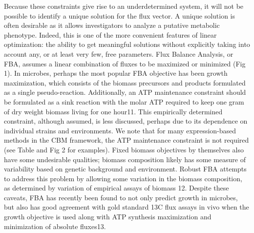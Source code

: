 \documentclass[phd,tocprelim]{cornell}
\theoremstyle{break}
\theoremstyle{empty}
\begin{document}
Because these constraints give rise to an underdetermined system, it
will not be possible to identify a unique solution for the flux
vector. A unique solution is often desirable as it allows
investigators to analyze a putative metabolic phenotype. Indeed, this
is one of the more convenient features of linear optimization: the
ability to get meaningful solutions without explicitly taking into
account any, or at least very few, free parameters.  Flux Balance
Analysis, or FBA, assumes a linear combination of fluxes to be
maximized or minimized (Fig 1). In microbes, perhaps the most popular
FBA objective has been growth maximization, which consists of the
biomass precursors and products formulated as a single
pseudo-reaction. Additionally, an ATP maintenance constraint should be
formulated as a sink reaction with the molar ATP required to keep one
gram of dry weight biomass living for one hour11. This empirically
determined constraint, although assumed, is less discussed, perhaps
due to its dependence on individual strains and environments.  We note
that for many expression-based methods in the CBM framework, the ATP
maintenance constraint is not required (see Table and Fig 2 for
examples). Fixed biomass objectives by themselves also have some
undesirable qualities; biomass composition likely has some measure of
variability based on genetic background and environment.  Robust FBA
attempts to address this problem by allowing some variation in the
biomass composition, as determined by variation of empirical assays of
biomass 12.  Despite these caveats, FBA has recently been found to not
only predict growth in microbes, but also has good agreement with gold
standard 13C flux assays in vivo when the growth objective is used
along with ATP synthesis maximization and minimization of absolute
fluxes13.
\end{document}
